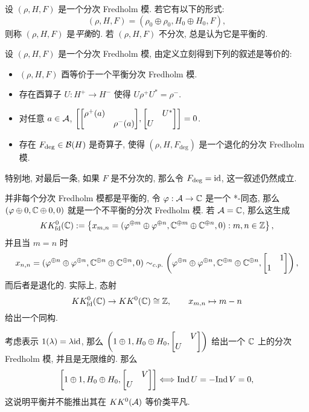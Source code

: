 \begin{Definition}[平衡]
	设 $ (\rho, H, F) $ 是一个分次 Fredholm 模. 若它有以下的形式:
	\[
		(\rho, H, F)=(\rho_0\oplus\rho_0, H_0\oplus H_0, F),
	\]
	则称 $ (\rho, H, F) $ 是\emph{平衡}的. 若 $ (\rho, H, F) $ 不分次, 总是认为它是平衡的.
\end{Definition}

设 $ (\rho, H, F) $ 是一个分次 Fredholm 模, 由定义立刻得到下列的叙述是等价的:
\begin{itemize}
	\item $ (\rho, H, F) $ 酉等价于一个平衡分次 Fredholm 模.
	\item 存在酉算子 $ U : H^+\to H^- $ 使得 $ U\rho^+U^*=\rho^- $.
	\item 对任意 $ a\in\mathcal{A} $, $ \left[\mqty[\rho^+(a) & \\ & \rho^-(a)],\mqty[ & U^* \\ U &]\right]=0 $.
	\item 存在 $ F_{\text{deg}}\in\mathcal{B}(H) $ 是奇算子, 使得 $ (\rho, H, F_{\text{deg}}) $ 是一个退化的分次 Fredholm 模.
\end{itemize}
特别地, 对最后一条, 如果 $ F $ 是不分次的, 那么令 $ F_{\text{deg}}=\mathrm{id} $, 这一叙述仍然成立.

并非每个分次 Fredholm 模都是平衡的, 令 $ \varphi : \mathcal{A}\to\mathbb{C} $ 是一个 *-同态, 那么 $ (\varphi\oplus 0, \mathbb{C}\oplus 0, 0) $ 就是一个不平衡的分次 Fredholm 模. 若 $ \mathcal{A}=\mathbb{C} $, 那么这生成
\[
	KK^0_{\text{fd}}(\mathbb{C}):=\left\{ x_{m,n}=(\varphi^{\oplus m}\oplus\varphi^{\oplus n}, \mathbb{C}^{\oplus m}\oplus\mathbb{C}^{\oplus n},0) : m,n\in\mathbb{Z} \right\},
\]
并且当 $ m=n $ 时
\[
	x_{n,n}=(\varphi^{\oplus n}\oplus\varphi^{\oplus n},\C^{\oplus n}\oplus\C^{\oplus n}, 0)\sim_{c.p.}\left(\varphi^{\oplus n}\oplus\varphi^{\oplus n},\C^{\oplus n}\oplus\C^{\oplus n},\mqty[ & 1 \\ 1 &]\right),
\]
而后者是退化的. 实际上, 态射
\[
	KK^0_{\text{fd}}(\mathbb{C})\to KK^0(\mathbb{C})\cong\mathbb{Z},\qquad x_{m,n}\mapsto m-n
\]
给出一个同构.

考虑表示 $ 1(\lambda)=\lambda\mathrm{id} $, 那么 $ \left(1\oplus 1, H_0\oplus H_0,\mqty[ & V \\ U &]\right) $ 给出一个 $ \mathbb{C} $ 上的分次 Fredholm 模, 并且是无限维的. 那么
\[
	\left[1\oplus 1, H_0\oplus H_0, \mqty[ & V \\ U &]\right]\Longleftrightarrow\Ind U=-\Ind V=0,
\]
这说明平衡并不能推出其在 $ KK^0(\mathcal{A}) $ 等价类平凡.

